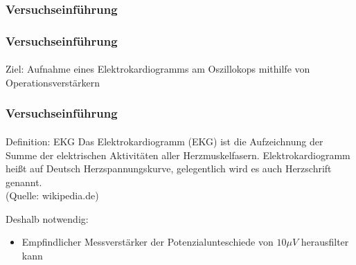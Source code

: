 \subsubsection{Versuchseinführung} %
\label{ssub:Versuchseinführung}
\begin{frame}
    \frametitle{Versuchseinführung}
    \framesubtitle{}
    \begin{block}{Ziel:}
        Aufnahme eines Elektrokardiogramms am Oszillokops mithilfe von
        Operationsverstärkern
    \end{block}
\end{frame}
\begin{frame}
    \frametitle{Versuchseinführung}
    \framesubtitle{}
    \begin{block}{Definition: EKG}
        Das Elektrokardiogramm (EKG) ist die Aufzeichnung der Summe der elektrischen
        Aktivitäten aller Herzmuskelfasern. Elektrokardiogramm heißt auf
        Deutsch Herzspannungskurve, gelegentlich wird es auch Herzschrift
        genannt.\\ (Quelle: wikipedia.de)
    \end{block}
    \begin{block}{Deshalb notwendig:}
        \begin{itemize}
            \item Empfindlicher Messverstärker der Potenzialunteschiede von
            $10 \mu V$ herausfilter kann
        \end{itemize}
    \end{block}     
\end{frame}

